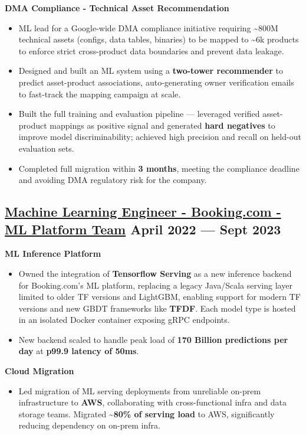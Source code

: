 \documentclass[a4,10pt]{article}
\newenvironment{zitemize}{
\begin{itemize}\itemsep0pt \parskip0pt \parsep1pt}
{\end{itemize}\vspace{-0.5cm}}
\newcommand{\hrole}[2]{{\fontsize{11}{12}\selectfont \textbf{\underline{#1}}  \hfill{#2}}}
\newcommand{\hprojectname}[1]{\vspace{0.4cm}\noindent\textbf{#1}\vspace{-0.1cm}}
\begin{document}
    \hprojectname{DMA Compliance - Technical Asset Recommendation}
    \begin{zitemize}
        \item ML lead for a Google-wide DMA compliance initiative requiring \textasciitilde800M technical assets (configs, data tables, binaries) to be mapped to \textasciitilde6k products to enforce strict cross-product data boundaries and prevent data leakage.
        \item Designed and built an ML system using a \textbf{two-tower recommender} to predict asset-product associations, auto-generating owner verification emails to fast-track the mapping campaign at scale.
        \item Built the full training and evaluation pipeline — leveraged verified asset-product mappings as positive signal and generated \textbf{hard negatives} to improve model discriminability; achieved high precision and recall on held-out evaluation sets.
        \item Completed full migration within \textbf{3 months}, meeting the compliance deadline and avoiding DMA regulatory risk for the company.
    \end{zitemize}
    
    

\subsection{\hrole{Machine Learning Engineer - Booking.com - ML Platform Team}{April 2022 --- Sept 2023}}

    \hprojectname{ML Inference Platform}
    \begin{zitemize}
        \item Owned the integration of \textbf{Tensorflow Serving} as a new inference backend for Booking.com's ML platform, replacing a legacy Java/Scala serving layer limited to older TF versions and LightGBM, enabling support for modern TF versions and new GBDT frameworks like \textbf{TFDF}. Each model type is hosted in an isolated Docker container exposing gRPC endpoints.
        \item New backend scaled to handle peak load of \textbf{170 Billion predictions per day} at \textbf{p99.9 latency of 50ms}.
    \end{zitemize}

    \hprojectname{Cloud Migration}
    \begin{zitemize}
        \item Led migration of ML serving deployments from unreliable on-prem infrastructure to \textbf{AWS}, collaborating with cross-functional infra and data storage teams. Migrated \textbf{\textasciitilde80\% of serving load} to AWS, significantly reducing dependency on on-prem infra.
    \end{zitemize}
\end{document}
